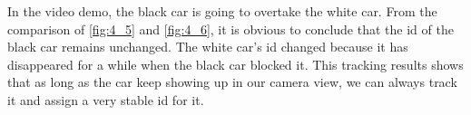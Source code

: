 \documentclass[10pt,twocolumn,letterpaper]{article}
\begin{document}
In the video demo, the black car is going to overtake the white car. From the comparison of \ref{fig:4_5} and \ref{fig:4_6}, it is obvious to conclude that the id of the black car remains unchanged. The white car’s id changed because it has disappeared for a while when the black car blocked it. This tracking results shows that as long as the car keep showing up in our camera view, we can always track it and assign a very stable id for it.

\newpage
{\small


}
\end{document}
